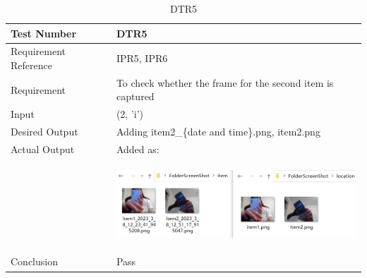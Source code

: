 \documentclass[12pt, titlepage]{article}
\begin{document}
\begin{table}[H]
\begin{center}
\begin{tabular}{|l | m{9cm}|}
\hline
  Test Number & DTR5\\
  \hline
  Requirement Reference & IPR5, IPR6\\
  \hline
  Requirement & To check whether the frame for the second item is captured\\
  \hline
  Input & (2, 'i')\\
  \hline
  Desired Output & Adding item2\_\{date and time\}.png, item2.png\\
  \hline
  Actual Output & Added as:\\&\includegraphics[width=90mm, height=33mm]{UT3.png}\\
  \hline
  Conclusion & Pass\\
  \hline
\end{tabular}
\end{center}   
\caption{DTR5}
\end{table}
\end{document}
